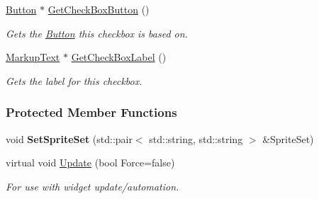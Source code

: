 \begin{DoxyCompactItemize}
\hyperlink{classphys_1_1UI_1_1Button}{Button} $\ast$ \hyperlink{classphys_1_1UI_1_1CheckBox_a728de15a5c8e512fd3fbb2b8a3f808ee}{GetCheckBoxButton} ()
\begin{DoxyCompactList}\small\item\em Gets the \hyperlink{classphys_1_1UI_1_1Button}{Button} this checkbox is based on. \item\end{DoxyCompactList}\item 
\hyperlink{classphys_1_1UI_1_1MarkupText}{MarkupText} $\ast$ \hyperlink{classphys_1_1UI_1_1CheckBox_a5f37379e69ef1259ab48c37a8dc200e9}{GetCheckBoxLabel} ()
\begin{DoxyCompactList}\small\item\em Gets the label for this checkbox. \item\end{DoxyCompactList}\end{DoxyCompactItemize}
\subsubsection*{Protected Member Functions}
\begin{DoxyCompactItemize}
\item 
\hypertarget{classphys_1_1UI_1_1CheckBox_ac20138946e42c608ac0808fc40fce4ce}{
void {\bfseries SetSpriteSet} (std::pair$<$ std::string, std::string $>$ \&SpriteSet)}
\label{classphys_1_1UI_1_1CheckBox_ac20138946e42c608ac0808fc40fce4ce}

\item 
\hypertarget{classphys_1_1UI_1_1CheckBox_ad988ce71809fd1dea6def42da50232eb}{
virtual void \hyperlink{classphys_1_1UI_1_1CheckBox_ad988ce71809fd1dea6def42da50232eb}{Update} (bool Force=false)}
\label{classphys_1_1UI_1_1CheckBox_ad988ce71809fd1dea6def42da50232eb}

\begin{DoxyCompactList}\small\item\em For use with widget update/automation. \item\end{DoxyCompactList}\end{DoxyCompactItemize}
